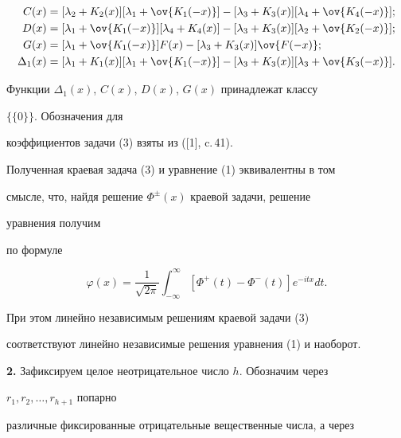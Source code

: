 \begin{align*} 


C(x)&=[\lambda_2+K_2(x)][\lambda_1+\ov{K_1(-x)}]


-[\lambda_3+K_3(x)][\lambda_4+\ov{K_4(-x)}];\\ 


% 


D(x)&=[\lambda_1+\ov{K_1(-x)}][\lambda_4+K_4(x)]- 


[\lambda_3+K_3(x)][\lambda_2+\ov{K_2(-x)}];\\ 


% 


G(x)&=[\lambda_1+\ov{K_1(-x)}]F(x)-[\lambda_3+K_3(x)] 


\ov{F(-x)};\\ 


% 


\Delta_1(x)&=[\lambda_1+K_1(x)][\lambda_1+\ov{K_1(-x)}]- 


[\lambda_3+K_3(x)][\lambda_3+\ov{K_3(-x)}]. 


\end{align*} 


Функции $\Delta_1(x)$, $C(x)$, $D(x)$, $G(x)$ принадлежат классу 


$\{\{0\}\}$. Обозначения для 


коэффициентов задачи (3) взяты из ([1], c.\,41). 


Полученная краевая задача (3) и уравнение (1) эквивалентны в том 


смысле, что, найдя решение $\Phi^\pm(x)$ краевой задачи, решение 


уравнения получим 


по формуле 


$$ 


\varphi(x)=\frac{1}{\sqrt{2\pi}}\int^\infty_{-\infty} 


[\Phi^+(t)-\Phi^-(t)]e^{-itx}dt. 


$$ 


При этом линейно независимым решениям краевой задачи (3) 


соответствуют линейно независимые решения уравнения (1) и наоборот. 


\medskip 


 


{\bf 2.} Зафиксируем целое неотрицательное число $h$. Обозначим через 


$r_1,r_2,\dotsc,r_{h+1}$ попарно 


различные фиксированные отрицательные вещественные числа, а через 


